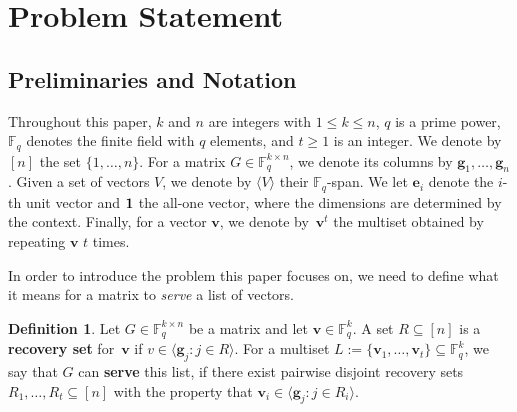 \documentclass[11pt,a4paper]{article}
\theoremstyle{definition}
\newtheorem{definition}[theorem]{Definition}
\newcommand{\bfe}{{\boldsymbol e}}
\newcommand{\bfg}{{\boldsymbol g}}
\newcommand{\bfv}{{\boldsymbol v}}
\newcommand{\bfx}{{\boldsymbol x}}
\newcommand{\F}{\mathbb{F}}
\newcommand{\mC}{\mathcal{C}}
\begin{document}
\section{Problem Statement}\label{Sec:ProbelmStatement}


\subsection{Preliminaries and Notation}

Throughout this paper, $k$ and $n$ are integers with $1 \le k \le n$, $q$ is a prime power, $\F_q$ denotes the finite field with $q$ elements, and $t \ge 1$ is an integer. We denote by $[n]$ the set $\{1,\dots,n\}$. For a matrix $G \in \F_q^{k \times n}$, we denote its columns by $\bfg_1, \dots, \bfg_n$. Given a set of vectors $V$, we denote by $\langle V\rangle$ their $\F_q$-span. We let $\bfe_i$ denote the $i$-th unit vector and $\bf1$ the all-one vector, where the dimensions are determined by the context. Finally, for a vector $\bfv$, we denote by~$\bfv^t$ the multiset obtained by repeating $\bfv$ $t$ times. 



In order to introduce the problem this paper focuses on, we need to define what it means for a matrix to \emph{serve} a list of vectors.

\begin{definition}
    Let $G \in \F_q^{k \times n}$ be a matrix and let $\bfv \in \F_q^k$. A set $R \subseteq [n]$ is a \textbf{recovery set} for~$\bfv$ if $v \in \langle \bfg_j : j \in R\rangle$. For a multiset $L:=\{\bfv_1,\dots,\bfv_t\} \subseteq \F_q^k$, we say that $G$ can \textbf{serve} this list, if there exist pairwise disjoint recovery sets $R_1,\dots,R_t \subseteq [n]$ with the property that $\bfv_i \in \langle \bfg_j : j \in R_i \rangle$.
\end{definition}
\end{document}
